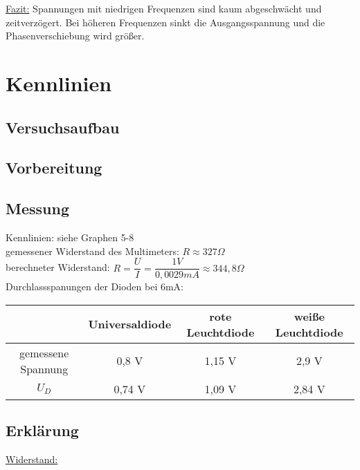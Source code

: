 \documentclass[paper=a4, fontsize=11pt]{scrartcl}
\numberwithin{equation}{section}
\numberwithin{figure}{section}
\numberwithin{table}{section}
\begin{document}
\underline{Fazit:}
Spannungen mit niedrigen Frequenzen sind kaum abgeschwächt und zeitverzögert. Bei höheren Frequenzen sinkt die Ausgangsspannung und die Phasenverschiebung wird größer.


\newpage

\section{Kennlinien}

\subsection{Versuchsaufbau}

\subsection{Vorbereitung}

\subsection{Messung}

Kennlinien: siehe Graphen 5-8 \\

gemessener Widerstand des Multimeters: $R \approx 327 \Omega$ \\

berechneter Widerstand: $R = \dfrac{U}{I} = \dfrac{1V}{0,0029 mA} \approx 344,8 \Omega$ \\

Durchlassspanungen der Dioden bei 6mA: \\

\begin{tabular}{|c|c|c|c|}
\hline
& Universaldiode & rote Leuchtdiode & weiße Leuchtdiode \\
\hline
gemessene Spannung & 0,8 V & 1,15 V & 2,9 V \\
\hline
$U_{D}$ & 0,74 V& 1,09 V & 2,84 V \\
\hline
\end{tabular}

\subsection{Erklärung}

\underline{Widerstand:} \\
\end{document}
